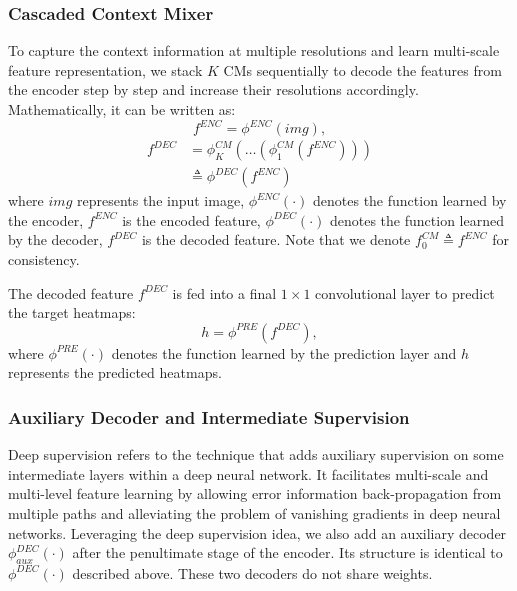 \documentclass[twocolumn]{svjour3}          \smartqed  \usepackage{natbib}
\begin{document}
\subsubsection{Cascaded Context Mixer}
\label{subsubsec:CCM}
To capture the context information at multiple resolutions and learn multi-scale feature representation, we stack $K$ CMs sequentially to decode the features from the encoder step by step and increase their resolutions accordingly. Mathematically, it can be written as:
\begin{equation}
f^{ENC} = \phi^{ENC}\left( img \right),
\label{eq:encoder}
\end{equation}
\begin{align}\nonumber
 f^{DEC} &= \phi_K^{CM}\left( {\dots \left( {\phi_1^{CM}\left( f^{ENC} \right)} \right)} \right) \\
    &\triangleq \phi^{DEC} \left( f^{ENC} \right)
  \label{eq:decoder}
\end{align}
where $img$ represents the input image, $\phi^{ENC}\left(  \cdot  \right)$ denotes the function learned by the encoder, $f^{ENC}$ is the encoded feature, $\phi^{DEC}\left(  \cdot  \right)$ denotes the function learned by the decoder, $f^{DEC}$ is the decoded feature. Note that we denote $f_{0}^{CM} \triangleq f^{ENC}$ for consistency.

The decoded feature $f^{DEC}$ is fed into a final $1 \times 1$ convolutional layer to predict the target heatmaps:
\begin{equation}
h = \phi^{PRE} \left( f^{DEC} \right),
\label{eq:predictor}
\end{equation}
where $\phi^{PRE} \left(  \cdot  \right)$ denotes the function learned by the prediction layer and $h$ represents the predicted heatmaps.

\subsubsection{Auxiliary Decoder and Intermediate Supervision}
\label{subsubsec:auxdecoder}
Deep supervision \citep{lee2015deeply} refers to the technique that adds auxiliary supervision on some intermediate layers within a deep neural network. It facilitates multi-scale and multi-level feature learning by allowing error information back-propagation from multiple paths and alleviating the problem of vanishing gradients in deep neural networks. Leveraging the deep supervision idea, we also add an auxiliary decoder $\phi^{DEC}_{aux}\left(  \cdot  \right)$ after the penultimate stage of the encoder. Its structure is identical to $\phi^{DEC}\left(  \cdot  \right)$ described above. These two decoders do not share weights.
\end{document}
